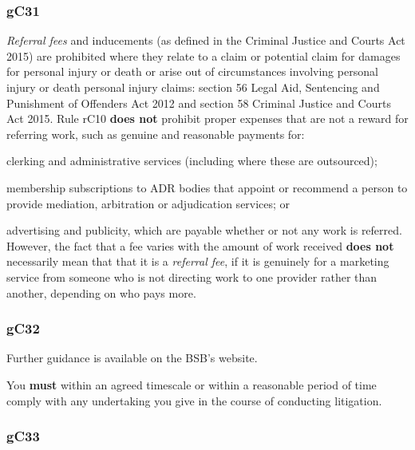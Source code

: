 \subsubsection{\color{darkgrey}gC31}

\emph{Referral fees} and inducements (as defined in the Criminal Justice
and Courts Act 2015) are prohibited where they relate to a claim or
potential claim for damages for personal injury or death or arise out of
circumstances involving personal injury or death personal injury claims:
section 56 Legal Aid, Sentencing and Punishment of Offenders Act 2012
and section 58 Criminal Justice and Courts Act 2015. Rule rC10 \textcolor{myred}{\textbf{does not}}
prohibit proper expenses that are not a reward for referring work, such
as genuine and reasonable payments for:
\begin{numlist}\item clerking and administrative services (including where these are
outsourced);
\item membership subscriptions to ADR bodies that appoint or recommend a
person to provide mediation, arbitration or adjudication services; or
\item advertising and publicity, which are payable whether or not any work
is referred. However, the fact that a fee varies with the amount of work
received \textcolor{myred}{\textbf{does not}} necessarily mean that that it is a \emph{referral
fee}, if it is genuinely for a marketing service from someone who is not
directing work to one provider rather than another, depending on who
pays more.
\end{numlist}

\subsubsection{\color{darkgrey}gC32}

Further guidance is available on the BSB's website.




You \textcolor{myred}{\textbf{must}} within an agreed timescale or within a reasonable period of
time comply with any undertaking you give in the course of conducting
litigation.




\subsubsection{\color{darkgrey}gC33}

